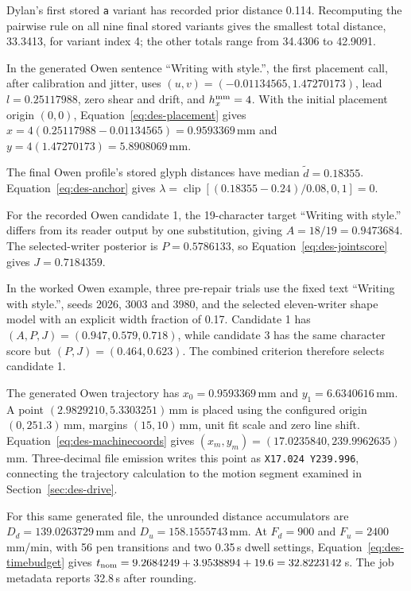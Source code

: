 Dylan's first stored \texttt{a} variant has recorded prior distance 0.114. Recomputing the pairwise rule on all nine final stored variants gives the smallest total distance, 33.3413, for variant index 4; the other totals range from 34.4306 to 42.9091.

In the generated Owen sentence ``Writing with style.'', the first placement call, after calibration and jitter, uses $(u,v)=(-0.01134565,1.47270173)$, lead $l=0.25117988$, zero shear and drift, and $h_x^{\rm mm}=4$. With the initial placement origin $(0,0)$, Equation~\ref{eq:des-placement} gives $x=4(0.25117988-0.01134565)=0.9593369$\,mm and $y=4(1.47270173)=5.8908069$\,mm.

The final Owen profile's stored glyph distances have median $\widetilde d=0.18355$. Equation~\ref{eq:des-anchor} gives $\lambda=\operatorname{clip}[(0.18355-0.24)/0.08,0,1]=0$.

For the recorded Owen candidate 1, the 19-character target ``Writing with style.'' differs from its reader output by one substitution, giving $A=18/19=0.9473684$. The selected-writer posterior is $P=0.5786133$, so Equation~\ref{eq:des-jointscore} gives $J=0.7184359$.

In the worked Owen example, three pre-repair trials use the fixed text ``Writing with style.'', seeds 2026, 3003 and 3980, and the selected eleven-writer shape model with an explicit width fraction of 0.17. Candidate 1 has $(A,P,J)=(0.947,0.579,0.718)$, while candidate 3 has the same character score but $(P,J)=(0.464,0.623)$. The combined criterion therefore selects candidate 1.

The generated Owen trajectory has $x_0=0.9593369$\,mm and $y_1=6.6340616$\,mm. A point $(2.9829210,5.3303251)$\,mm is placed using the configured origin $(0,251.3)$\,mm, margins $(15,10)$\,mm, unit fit scale and zero line shift. Equation~\ref{eq:des-machinecoords} gives $(x_m,y_m)=(17.0235840,239.9962635)$\,mm. Three-decimal file emission writes this point as \texttt{X17.024 Y239.996}, connecting the trajectory calculation to the motion segment examined in Section~\ref{sec:des-drive}.

For this same generated file, the unrounded distance accumulators are $D_d=139.0263729$\,mm and $D_u=158.1555743$\,mm. At $F_d=900$ and $F_u=2400$\,mm/min, with 56 pen transitions and two 0.35\,s dwell settings, Equation~\ref{eq:des-timebudget} gives $t_{\rm nom}=9.2684249+3.9538894+19.6=32.8223142$\,s. The job metadata reports 32.8\,s after rounding.



